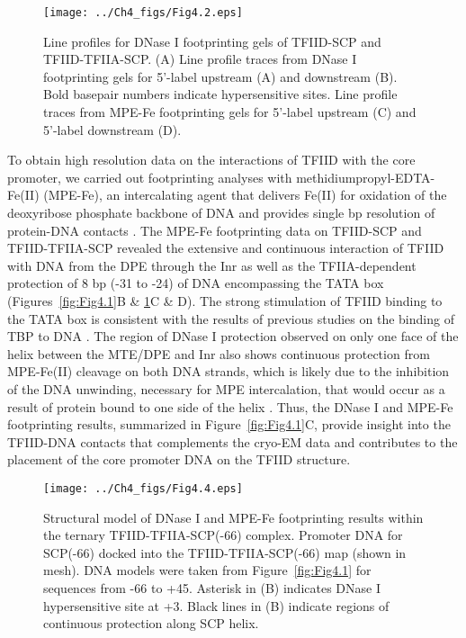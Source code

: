 \begin{figure}
\centering
\texttt{[image: ../Ch4\_figs/Fig4.2.eps]}
\caption[Line profiles for DNase I footprinting gels of TFIID-SCP and TFIID-TFIIA-SCP]{Line profiles for DNase I footprinting gels of TFIID-SCP and TFIID-TFIIA-SCP. (A) Line profile traces from DNase I footprinting gels for 5’-label upstream (A) and downstream (B). Bold basepair numbers indicate hypersensitive sites. Line profile traces from MPE-Fe footprinting gels for 5’-label upstream (C) and 5’-label downstream (D).}
\label{fig:Fig4.2}
\end{figure}
\indent To obtain high resolution data on the interactions of TFIID with the core promoter, we carried out footprinting analyses with methidiumpropyl-EDTA-Fe(II) (MPE-Fe), an intercalating agent that delivers Fe(II) for oxidation of the deoxyribose phosphate backbone of DNA and provides single bp resolution of protein-DNA contacts \cite{Hertzberg_3897,Papavassiliou_3156,Va_3928}. The MPE-Fe footprinting data on TFIID-SCP and TFIID-TFIIA-SCP revealed the extensive and continuous interaction of TFIID with DNA from the DPE through the Inr as well as the TFIIA-dependent protection of 8 bp (-31 to -24) of DNA encompassing the TATA box (Figures~\ref{fig:Fig4.1}B \& \ref{fig:Fig4.2}C \& D). The strong stimulation of TFIID binding to the TATA box is consistent with the results of previous studies on the binding of TBP to DNA \cite{Geiger_2949,Kim_3377,Kim_3416,Nikolov_3177}. The region of DNase I protection observed on only one face of the helix between the MTE/DPE and Inr also shows continuous protection from MPE-Fe(II) cleavage on both DNA strands, which is likely due to the inhibition of the DNA unwinding, necessary for MPE intercalation, that would occur as a result of protein bound to one side of the helix \cite{Uchida_3659}. Thus, the DNase I and MPE-Fe footprinting results, summarized in Figure~\ref{fig:Fig4.1}C, provide insight into the TFIID-DNA contacts that complements the cryo-EM data and contributes to the placement of the core promoter DNA on the TFIID structure. \\
\begin{figure}
\centering
\texttt{[image: ../Ch4\_figs/Fig4.4.eps]}
\caption[Structural model of DNase I and MPE-Fe footprinting results within the ternary TFIID-TFIIA-SCP(-66) complex]{Structural model of DNase I and MPE-Fe footprinting results within the ternary TFIID-TFIIA-SCP(-66) complex. Promoter DNA for SCP(-66) docked into the TFIID-TFIIA-SCP(-66) map (shown in mesh). DNA models were taken from Figure~\ref{fig:Fig4.1} for sequences from -66 to +45. Asterisk in (B) indicates DNase I hypersensitive site at +3. Black lines in (B) indicate regions of continuous protection along SCP helix. }
\label{fig:Fig4.4}
\end{figure}
